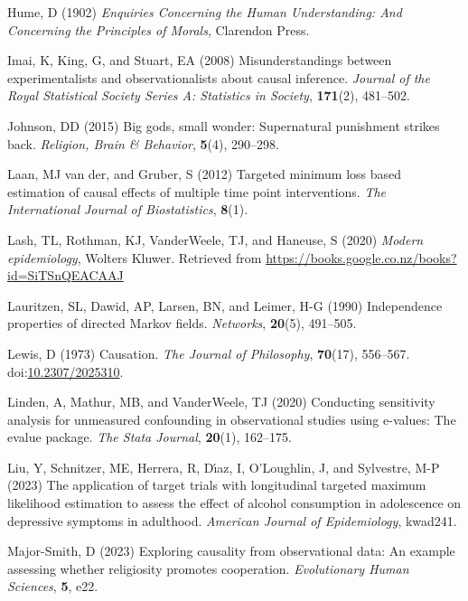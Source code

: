 \documentclass[
  single column]{article}
\newlength{\cslhangindent}
\newenvironment{CSLReferences}[2] %
 {\begin{list}{}{%
  \setlength{\itemindent}{0pt}
  \setlength{\leftmargin}{0pt}
  \setlength{\parsep}{0pt}
  \ifodd #1
   \setlength{\leftmargin}{\cslhangindent}
   \setlength{\itemindent}{-1\cslhangindent}
  \fi
  \setlength{\itemsep}{#2\baselineskip}}}
 {\end{list}}
\begin{document}
\begin{CSLReferences}{1}{0}
Hume, D (1902) \emph{Enquiries Concerning the Human Understanding: And
Concerning the Principles of Morals}, Clarendon Press.

Imai, K, King, G, and Stuart, EA (2008) Misunderstandings between
experimentalists and observationalists about causal inference.
\emph{Journal of the Royal Statistical Society Series A: Statistics in
Society}, \textbf{171}(2), 481--502.

Johnson, DD (2015) Big gods, small wonder: Supernatural punishment
strikes back. \emph{Religion, Brain \& Behavior}, \textbf{5}(4),
290--298.

Laan, MJ van der, and Gruber, S (2012) Targeted minimum loss based
estimation of causal effects of multiple time point interventions.
\emph{The International Journal of Biostatistics}, \textbf{8}(1).

Lash, TL, Rothman, KJ, VanderWeele, TJ, and Haneuse, S (2020)
\emph{Modern epidemiology}, Wolters Kluwer. Retrieved from
\url{https://books.google.co.nz/books?id=SiTSnQEACAAJ}

Lauritzen, SL, Dawid, AP, Larsen, BN, and Leimer, H-G (1990)
Independence properties of directed {M}arkov fields. \emph{Networks},
\textbf{20}(5), 491--505.

Lewis, D (1973) Causation. \emph{The Journal of Philosophy},
\textbf{70}(17), 556--567.
doi:\href{https://doi.org/10.2307/2025310}{10.2307/2025310}.

Linden, A, Mathur, MB, and VanderWeele, TJ (2020) Conducting sensitivity
analysis for unmeasured confounding in observational studies using
e-values: The evalue package. \emph{The Stata Journal}, \textbf{20}(1),
162--175.

Liu, Y, Schnitzer, ME, Herrera, R, Dı́az, I, O'Loughlin, J, and
Sylvestre, M-P (2023) The application of target trials with longitudinal
targeted maximum likelihood estimation to assess the effect of alcohol
consumption in adolescence on depressive symptoms in adulthood.
\emph{American Journal of Epidemiology}, kwad241.

Major-Smith, D (2023) Exploring causality from observational data: An
example assessing whether religiosity promotes cooperation.
\emph{Evolutionary Human Sciences}, \textbf{5}, e22.


\end{CSLReferences}
\end{document}

